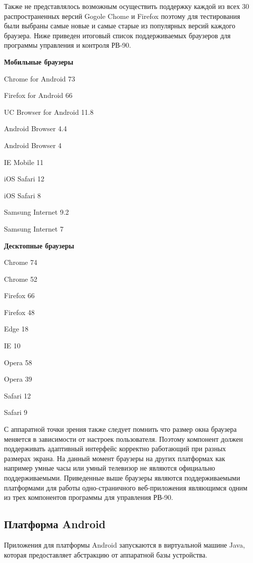 Также не представлялось возможным осуществить поддержку каждой из всех 30 распространенных версий Gogole Chome и Firefox поэтому для тестирования были выбраны самые новые и самые старые из популярных версий каждого браузера.
Ниже приведен итоговый список поддерживаемых браузеров для программы управления и контроля РВ-90.

\textbf{Мобильные браузеры}
\begin{my_itemize}
\item Chrome for Android 73
\item Firefox for Android 66
\item UC Browser for Android 11.8
\item Android Browser 4.4
\item Android Browser 4
\item IE Mobile 11
\item iOS Safari 12
\item iOS Safari 8
\item Samsung Internet 9.2
\item Samsung Internet 7
\end{my_itemize}

\textbf{Десктопные браузеры}
\begin{my_itemize}
\item Chrome 74
\item Chrome 52
\item Firefox 66
\item Firefox 48
\item Edge 18
\item IE 10
\item Opera 58
\item Opera 39
\item Safari 12
\item Safari 9
\end{my_itemize}

С аппаратной точки зрения также следует помнить что размер окна браузера меняется в зависимости от настроек пользователя. Поэтому компонент должен поддерживать адаптивный интерфейс  корректно работающий при разных размерах экрана.  На данный момент браузеры на других платформах как например умные часы или умный телевизор не являются официально поддерживаемыми. Приведенные выше браузеры являются поддерживаемыми платформами для работы одно-страничного веб-приложения являющимся одним из трех компонентов программы для управления РВ-90.


\newpage
\subsection{Платформа Android}
Приложения для платформы Android запускаются в виртуальной машине Java, которая предоставляет абстракцию от аппаратной базы устройства.


